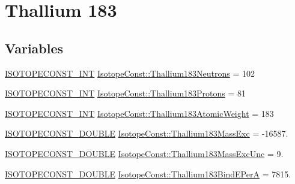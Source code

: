 \hypertarget{group___isotope_const-_thallium-_tl183}{}\section{Thallium 183}
\label{group___isotope_const-_thallium-_tl183}
\subsection*{Variables}
\begin{DoxyCompactItemize}
\item 
\mbox{\hyperlink{group___isotope_const-_macros_ga5f18360b3e99483a35c32d789e62621c}{I\+S\+O\+T\+O\+P\+E\+C\+O\+N\+S\+T\+\_\+\+I\+NT}} \mbox{\hyperlink{group___isotope_const-_thallium-_tl183_gae67694a7bb66f9f10f64f0383a5bffbd}{Isotope\+Const\+::\+Thallium183\+Neutrons}} = 102
\item 
\mbox{\hyperlink{group___isotope_const-_macros_ga5f18360b3e99483a35c32d789e62621c}{I\+S\+O\+T\+O\+P\+E\+C\+O\+N\+S\+T\+\_\+\+I\+NT}} \mbox{\hyperlink{group___isotope_const-_thallium-_tl183_ga94788046122a5b51e6bc243fae086c2c}{Isotope\+Const\+::\+Thallium183\+Protons}} = 81
\item 
\mbox{\hyperlink{group___isotope_const-_macros_ga5f18360b3e99483a35c32d789e62621c}{I\+S\+O\+T\+O\+P\+E\+C\+O\+N\+S\+T\+\_\+\+I\+NT}} \mbox{\hyperlink{group___isotope_const-_thallium-_tl183_gae2ad8b053bac7d4bcfdf4e5eb76abb7f}{Isotope\+Const\+::\+Thallium183\+Atomic\+Weight}} = 183
\item 
\mbox{\hyperlink{group___isotope_const-_macros_ga8f45a7272ce02c0b4c65c44636ed719a}{I\+S\+O\+T\+O\+P\+E\+C\+O\+N\+S\+T\+\_\+\+D\+O\+U\+B\+LE}} \mbox{\hyperlink{group___isotope_const-_thallium-_tl183_ga243d9df63fa4c64af9400a0b2d5807d2}{Isotope\+Const\+::\+Thallium183\+Mass\+Exc}} = -\/16587.
\item 
\mbox{\hyperlink{group___isotope_const-_macros_ga8f45a7272ce02c0b4c65c44636ed719a}{I\+S\+O\+T\+O\+P\+E\+C\+O\+N\+S\+T\+\_\+\+D\+O\+U\+B\+LE}} \mbox{\hyperlink{group___isotope_const-_thallium-_tl183_gad3658abe91de392921952a21cdca943c}{Isotope\+Const\+::\+Thallium183\+Mass\+Exc\+Unc}} = 9.
\item 
\mbox{\hyperlink{group___isotope_const-_macros_ga8f45a7272ce02c0b4c65c44636ed719a}{I\+S\+O\+T\+O\+P\+E\+C\+O\+N\+S\+T\+\_\+\+D\+O\+U\+B\+LE}} \mbox{\hyperlink{group___isotope_const-_thallium-_tl183_gaa9c9160a129b1f344aee579a816af1fc}{Isotope\+Const\+::\+Thallium183\+Bind\+E\+PerA}} = 7815.
\item 

\end{DoxyCompactItemize}
